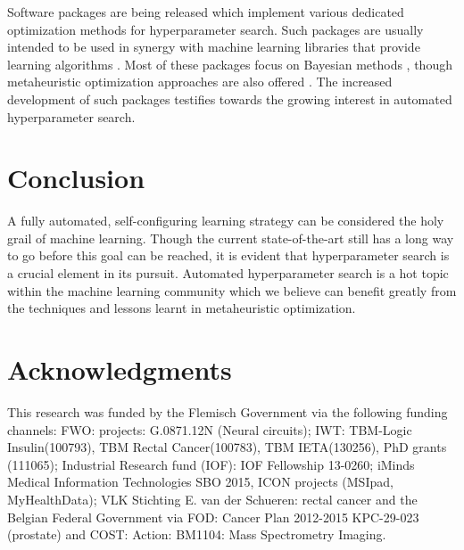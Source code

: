 \documentclass{mic2015}
\begin{document}
Software packages are being released which implement various dedicated optimization methods for hyperparameter search. Such packages are usually intended to be used in synergy with machine learning libraries that provide learning algorithms \citep{pedregosa2011scikit}. Most of these packages focus on Bayesian methods \citep{hutter2009paramils, snoek2012practical, bergstra2013hyperopt}, though metaheuristic optimization approaches are also offered \citep{DBLP:journals/corr/ClaesenSPMM14}. The increased development of such packages testifies towards the growing interest in automated hyperparameter search.

\section{Conclusion}
A fully automated, self-configuring learning strategy can be considered the holy grail of machine learning. Though the current state-of-the-art still has a long way to go before this goal can be reached, it is evident that hyperparameter search is a crucial element in its pursuit. Automated hyperparameter search is a hot topic within the machine learning community which we believe can benefit greatly from the techniques and lessons learnt in metaheuristic optimization.


\section*{Acknowledgments}
This research was funded by the Flemisch Government via the following funding channels: FWO: projects:  G.0871.12N (Neural circuits); IWT: TBM-Logic Insulin(100793), TBM Rectal Cancer(100783), TBM IETA(130256), PhD grants (111065); Industrial Research fund (IOF): IOF Fellowship 13-0260; iMinds Medical Information Technologies SBO 2015, ICON projects (MSIpad, MyHealthData); VLK Stichting E. van der Schueren: rectal cancer and the Belgian Federal Government via FOD: Cancer Plan 2012-2015 KPC-29-023 (prostate) and COST: Action: BM1104: Mass Spectrometry Imaging.


\newpage


\end{document}
